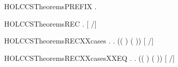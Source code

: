 \newcommand{\HOLCCSTheoremsPARXXcasesXXEQ}{\UseVerbatim{HOLCCSTheoremsPARXXcasesXXEQ}}
\begin{SaveVerbatim}{HOLCCSTheoremsPREFIX}
\HOLTokenTurnstile{} \HOLSymConst{\HOLTokenForall{}} .  \HOLTokenTransBegin{}\HOLTokenTransEnd {}
\end{SaveVerbatim}
\newcommand{\HOLCCSTheoremsPREFIX}{\UseVerbatim{HOLCCSTheoremsPREFIX}}
\begin{SaveVerbatim}{HOLCCSTheoremsREC}
\HOLTokenTurnstile{} \HOLSymConst{\HOLTokenForall{}}   . [  /]  \HOLTokenTransBegin{}\HOLTokenTransEnd {} \HOLSymConst{\HOLTokenImp{}}    \HOLTokenTransBegin{}\HOLTokenTransEnd {}
\end{SaveVerbatim}
\newcommand{\HOLCCSTheoremsREC}{\UseVerbatim{HOLCCSTheoremsREC}}
\begin{SaveVerbatim}{HOLCCSTheoremsRECXXcases}
\HOLTokenTurnstile{} \HOLSymConst{\HOLTokenForall{}}   .
          \HOLTokenTransBegin{}\HOLTokenTransEnd {} \HOLSymConst{\HOLTokenImp{}}
       \HOLSymConst{\HOLTokenExists{}} . (( \HOLSymConst{=} ) \HOLSymConst{\HOLTokenConj{}} ( \HOLSymConst{=} )) \HOLSymConst{\HOLTokenConj{}} [  /]  \HOLTokenTransBegin{}\HOLTokenTransEnd {}
\end{SaveVerbatim}
\newcommand{\HOLCCSTheoremsRECXXcases}{\UseVerbatim{HOLCCSTheoremsRECXXcases}}
\begin{SaveVerbatim}{HOLCCSTheoremsRECXXcasesXXEQ}
\HOLTokenTurnstile{} \HOLSymConst{\HOLTokenForall{}}   .
          \HOLTokenTransBegin{}\HOLTokenTransEnd {} \HOLSymConst{\HOLTokenEquiv{}}
       \HOLSymConst{\HOLTokenExists{}} . (( \HOLSymConst{=} ) \HOLSymConst{\HOLTokenConj{}} ( \HOLSymConst{=} )) \HOLSymConst{\HOLTokenConj{}} [  /]  \HOLTokenTransBegin{}\HOLTokenTransEnd {}
\end{SaveVerbatim}
